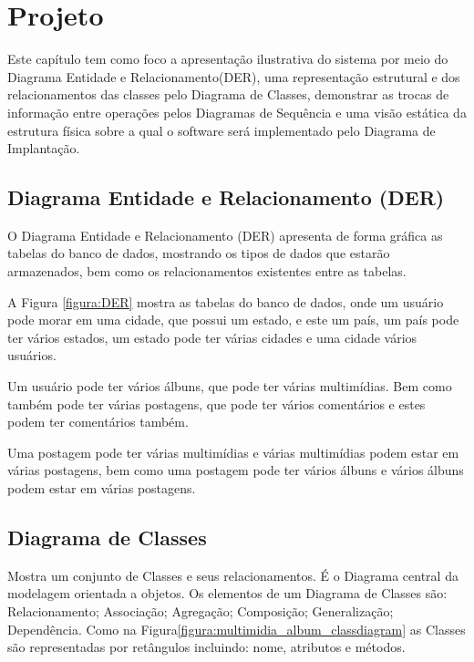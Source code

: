 \chapter{Projeto}

Este capítulo tem como foco a apresentação ilustrativa do sistema por meio do Diagrama Entidade e Relacionamento(DER), uma representação estrutural e dos relacionamentos das classes pelo Diagrama de Classes, demonstrar as trocas de informação entre operações pelos Diagramas de Sequência e uma visão estática da estrutura física sobre a qual o software será implementado pelo Diagrama de Implantação.

\section{Diagrama Entidade e Relacionamento (DER)}

O Diagrama Entidade e Relacionamento (DER) apresenta de forma gráfica as tabelas do banco de dados, mostrando os tipos de dados que estarão armazenados, bem como os relacionamentos existentes entre as tabelas.

A Figura \ref{figura:DER} mostra as tabelas do banco de dados, onde um usuário pode morar em uma cidade, que possui um estado, e este um país, um país pode ter vários estados, um estado pode ter várias cidades e uma cidade vários usuários.

Um usuário pode ter vários álbuns, que pode ter várias multimídias. Bem como também pode ter várias postagens, que pode ter vários comentários e estes podem ter comentários também.

Uma postagem pode ter várias multimídias e várias multimídias podem estar em várias postagens, bem como uma postagem pode ter vários álbuns e vários álbuns podem estar em várias postagens.


\newpage

\section{Diagrama de Classes}

Mostra um conjunto de Classes e seus relacionamentos. É o Diagrama central da
modelagem orientada a objetos. Os elementos de um Diagrama de Classes são:
Relacionamento; Associação; Agregação; Composição; Generalização; Dependência. Como
na Figura\ref{figura:multimidia_album_classdiagram} as Classes são representadas por retângulos incluindo: nome, atributos e
métodos.

